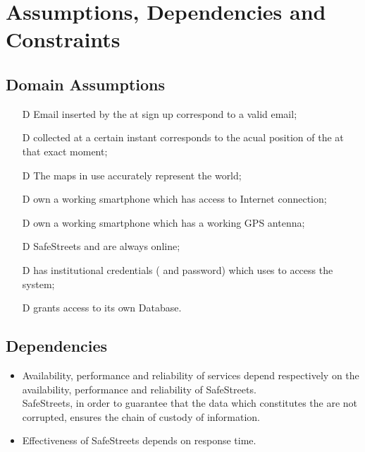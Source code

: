 \documentclass[../../RASD.tex]{subfiles}
\begin{document}
\section{Assumptions, Dependencies and Constraints}
	\subsection{Domain Assumptions}
	 	\begin{itemize}
	 		\item[D\subs{1}]Email inserted by the  at sign up correspond to a valid email;
	 		\item[D\subs{2}] collected at a certain instant corresponds to the acual position of the  at that exact moment;
	 		\item[D\subs{3}]The maps in use accurately represent the world;
	 		\item[D\subs{4}] own a working smartphone which has access to Internet connection;
	 		\item[D\subs{5}] own a working smartphone which has a working GPS antenna;
	 		\item[D\subs{6}]SafeStreets and  are always online;
	 		\item[D\subs{7}] has institutional credentials ( and password) which uses to access the system;
	 		\item[D\subs{8}] grants access to its own  Database.
	 	\end{itemize}
 	
 	\subsection{Dependencies}
 		\begin{itemize}
 		\item Availability, performance and reliability of services depend respectively on the availability, performance and reliability of SafeStreets. \\
 		SafeStreets, in order to guarantee that the data which constitutes the  are not corrupted, ensures the chain of custody of information. 
 		\item Effectiveness of SafeStreets depends on  response time. 
 
 		\end{itemize}
\end{document}
